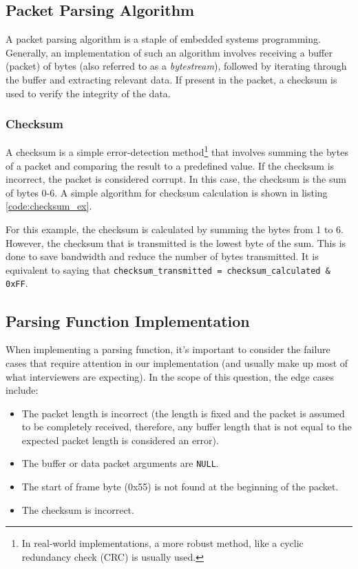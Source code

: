 \documentclass[main.tex]{subfiles}
\begin{document}
\spoilerline

\subsection{Packet Parsing Algorithm}
A packet parsing algorithm is a staple of embedded systems programming. Generally, an implementation of such an algorithm involves receiving a buffer (packet) of bytes (also referred to as a \textit{bytestream}), followed by iterating through the buffer and extracting relevant data. If present in the packet, a checksum is used to verify the integrity of the data.

\subsubsection{Checksum}
A checksum is a simple error-detection method\footnote{In real-world implementations, a more robust method, like a cyclic redundancy check (CRC) is usually used.} that involves summing the bytes of a packet and comparing the result to a predefined value. If the checksum is incorrect, the packet is considered corrupt. In this case, the checksum is the sum of bytes 0-6. A simple algorithm for checksum calculation is shown in listing \ref{code:checksum_ex}.



\noindent For this example, the checksum is calculated by summing the bytes from 1 to 6. However, the checksum that is transmitted is the lowest byte of the sum. This is done to save bandwidth and reduce the number of bytes transmitted. It is equivalent to saying that \texttt{checksum\_transmitted = checksum\_calculated \& 0xFF}.

\subsection{Parsing Function Implementation}
When implementing a parsing function, it's important to consider the failure cases that require attention in our implementation (and usually make up most of what interviewers are expecting). In the scope of this question, the edge cases include:
\begin{itemize}
    \item The packet length is incorrect (the length is fixed and the packet is assumed to be completely received, therefore, any buffer length that is not equal to the expected packet length is considered an error).
    \item The buffer or data packet arguments are \texttt{NULL}.
    \item The start of frame byte (0x55) is not found at the beginning of the packet.
    \item The checksum is incorrect.
\end{itemize}
\end{document}
